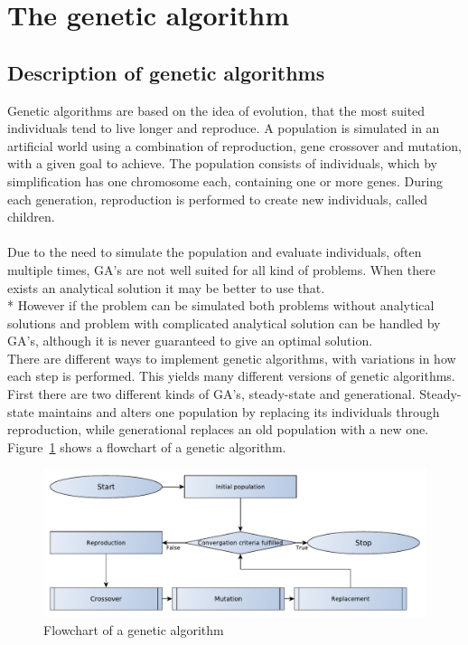 \pagebreak
\section{The genetic algorithm}

\subsection{Description of genetic algorithms}
Genetic algorithms are based on the idea of evolution, that the most suited individuals tend to live longer and reproduce. A population is simulated in an artificial world using a combination of reproduction, gene crossover and mutation, with a given goal to achieve. The population consists of individuals, which by simplification has one chromosome each, containing one or more genes. During each generation, reproduction is performed to create new individuals, called children.\\
\\
Due to the need to simulate the population and evaluate individuals, often multiple times, GA's are not well suited for all kind of problems. When there exists an analytical solution it may be better to use that.\\* %
However if the problem can be simulated both problems without analytical solutions and problem with complicated analytical solution can be handled by GA's, although it is never guaranteed to give an optimal solution.\\
There are different ways to implement genetic algorithms, with variations in how each step is performed. This yields many different versions of genetic algorithms. First there are two different kinds of GA's, steady-state and generational. Steady-state maintains and alters one population by replacing its individuals through reproduction, while generational replaces an old population with a new one.
Figure~\ref{GeneticFlowChart1} shows a flowchart of a genetic algorithm.
\begin{figure}[!h]
	\centering
	\includegraphics[width=\textwidth]{chapter_4_methods/GeneticFlowChart-Generic}
  	\caption[Flowchart of a genetic algorithm]
  	{Flowchart of a genetic algorithm}
	\label{GeneticFlowChart1}
\end{figure}
